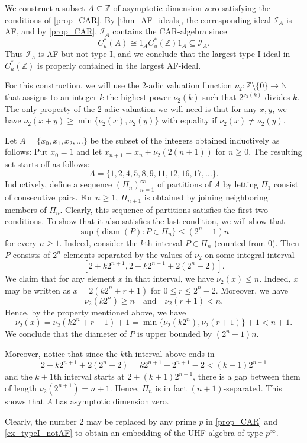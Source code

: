 \documentclass[12pt, a4paper, oneside]{amsart}
\newcommand{\0}{\mathbf{0}}
\newcommand{\1}{\mathbf{1}}
\newcommand{\N}{\mathbb{N}}   %
\newcommand{\Z}{\mathbb{Z}}   %
\newcommand{\I}{\mathscr{I}}
\begin{document}
	\begin{example}
		\label{ex_typeI_notAF}
		We construct a subset \(A \subseteq \Z\) of asymptotic dimension zero satisfying the conditions of \cref{prop_CAR}. By \cref{thm_AF_ideals}, the corresponding ideal \(\I_A\) is AF, and by \cref{prop_CAR}, \(\I_A\) contains the CAR-algebra since \[C_u^*(A) \cong 1_A C_u^*(\Z) 1_A \subseteq \I_A.\]Thus \(\I_A\) is AF but not type I, and we conclude that the largest type I-ideal in \(C_u^*(\Z)\) is properly contained in the largest AF-ideal. 
		
		For this construction, we will use the 2-adic valuation function \(\nu_2 \colon \Z \setminus \{0\} \to \N\) that assigns to an integer \(k\) the highest power \(\nu_2(k)\) such that \(2^{\nu_2(k)}\) divides \(k\). The only property of the 2-adic valuation we will need is that for any \(x, y\), we have \(\nu_2(x+y) \geq \min\{ \nu_2(x), \nu_2(y) \}\) with equality if \(\nu_2(x) \neq \nu_2(y)\).  
		
		Let \(A = \{x_0, x_1, x_2, \ldots \}\) be the subset of the integers obtained inductively as follows: Put \(x_0 = 1\) and let \(x_{n+1} = x_n + \nu_2(2(n+1))\) for \(n \geq 0\). The resulting set starts off as follows: 
		\[A = \{1, 2, 4, 5, 8, 9, 11, 12, 16, 17, \ldots \}.\]
		Inductively, define a sequence \((\Pi_n)_{n=1}^\infty\) of partitions of \(A\) by letting \(\Pi_1\) consist of consecutive pairs. For \(n \geq 1\), \(\Pi_{n+1}\) is obtained by joining neighboring members of \(\Pi_n\). Clearly, this sequence of partitions satisfies the first two conditions. To show that it also satisfies the last condition, we will show that \[\sup \{ \operatorname{diam}(P) : P \in \Pi_n \} \leq (2^n-1)n\] for every \(n \geq 1\). Indeed, consider the \(k\)th interval \(P \in \Pi_n\) (counted from 0). Then \(P\) consists of \(2^n\) elements separated by the values of \(\nu_2\) on some integral interval 
		\[ [2+k2^{n+1}, 2+k2^{n+1} + 2(2^n-2)].\] We claim that for any element \(x\) in that interval, we have \(\nu_2(x) \leq n\). Indeed, \(x\) may be written as \(x = 2(k2^n + r+1) \) for \(0 \leq r \leq 2^n-2\). Moreover, we have 
		\[\nu_2(k2^n) \geq n \quad \text{and} \quad \nu_2(r+1) < n.\] Hence, by the property mentioned above, we have \[\nu_2(x) = \nu_2(k2^n + r+1) + 1 = \min \{ \nu_2(k2^n), \nu_2(r+1) \} + 1 < n+1.\] We conclude that the diameter of \(P\) is upper bounded by \((2^n-1)n\). 
		
		Moreover, notice that since the \(k\)th interval above ends in 
		\[2+k2^{n+1}+2(2^n-2) = k2^{n+1} +2^{n+1}-2 < (k+1) 2^{n+1}\] and the \(k+1\)th interval starts at \(2+(k+1)2^{n+1}\), there is a gap between them of length \(\nu_2(2^{n+1}) = n+1\). Hence, \(\Pi_n\) is in fact \((n+1)\)-separated. This shows that \(A\) has asymptotic dimension zero. 
	\end{example}
	
	\begin{remark}
		Clearly, the number 2 may be replaced by any prime \(p\) in \cref{prop_CAR} and \cref{ex_typeI_notAF} to obtain an embedding of the UHF-algebra of type \(p^\infty\). 
	\end{remark}
	
	\printbibliography{}
	
\end{document}
